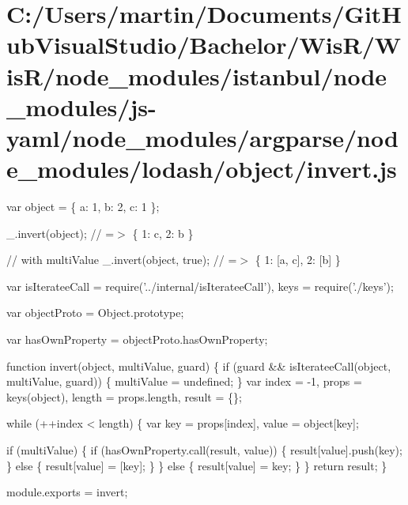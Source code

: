 \hypertarget{_c_1_2_users_2martin_2_documents_2_git_hub_visual_studio_2_bachelor_2_wis_r_2_wis_r_2node_modulea1829d168840fb4113b0be4581cb8967}{}\section{C\+:/\+Users/martin/\+Documents/\+Git\+Hub\+Visual\+Studio/\+Bachelor/\+Wis\+R/\+Wis\+R/node\+\_\+modules/istanbul/node\+\_\+modules/js-\/yaml/node\+\_\+modules/argparse/node\+\_\+modules/lodash/object/invert.\+js}
var object = \{ \textquotesingle{}a\textquotesingle{}\+: 1, \textquotesingle{}b\textquotesingle{}\+: 2, \textquotesingle{}c\textquotesingle{}\+: 1 \};

\+\_\+.\+invert(object); // =$>$ \{ \textquotesingle{}1\textquotesingle{}\+: \textquotesingle{}c\textquotesingle{}, \textquotesingle{}2\textquotesingle{}\+: \textquotesingle{}b\textquotesingle{} \}

// with {\ttfamily multi\+Value} \+\_\+.\+invert(object, true); // =$>$ \{ \textquotesingle{}1\textquotesingle{}\+: \mbox{[}\textquotesingle{}a\textquotesingle{}, \textquotesingle{}c\textquotesingle{}\mbox{]}, \textquotesingle{}2\textquotesingle{}\+: \mbox{[}\textquotesingle{}b\textquotesingle{}\mbox{]} \}


\begin{DoxyCodeInclude}
var isIterateeCall = require(\textcolor{stringliteral}{'../internal/isIterateeCall'}),
    keys = require(\textcolor{stringliteral}{'./keys'});

var objectProto = Object.prototype;

var hasOwnProperty = objectProto.hasOwnProperty;

\textcolor{keyword}{function} invert(\textcolor{keywordtype}{object}, multiValue, guard) \{
  \textcolor{keywordflow}{if} (guard && isIterateeCall(\textcolor{keywordtype}{object}, multiValue, guard)) \{
    multiValue = undefined;
  \}
  var index = -1,
      props = keys(\textcolor{keywordtype}{object}),
      length = props.length,
      result = \{\};

  \textcolor{keywordflow}{while} (++index < length) \{
    var key = props[index],
        value = \textcolor{keywordtype}{object}[key];

    \textcolor{keywordflow}{if} (multiValue) \{
      \textcolor{keywordflow}{if} (hasOwnProperty.call(result, value)) \{
        result[value].push(key);
      \} \textcolor{keywordflow}{else} \{
        result[value] = [key];
      \}
    \}
    \textcolor{keywordflow}{else} \{
      result[value] = key;
    \}
  \}
  \textcolor{keywordflow}{return} result;
\}

module.exports = invert;
\end{DoxyCodeInclude}
 
